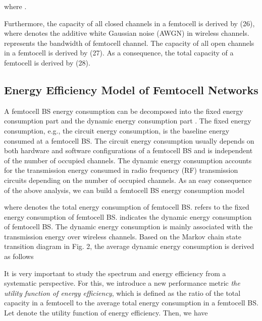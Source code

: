 \documentclass[10pt,final,journal,letterpaper,twoside,twocolumn]{IEEEtran}
\begin{document}
where .

Furthermore, the capacity of all closed channels in a femtocell is derived by (26),
where  denotes the additive white Gaussian noise (AWGN) in wireless
channels.  represents the bandwidth of femtocell channel. The capacity
of all open channels in a femtocell is derived by (27).
As a consequence, the total capacity of a femtocell is derived by (28).
\begin{figure*}[!t]





\end{figure*}



\subsection{Energy Efficiency Model of Femtocell Networks}

A femtocell BS energy consumption can be decomposed into the fixed energy
consumption part and the dynamic energy consumption part \cite{Humar11}. The fixed
energy consumption, e.g., the circuit energy consumption, is the baseline
energy consumed at a femtocell BS. The circuit energy consumption usually
depends on both hardware and software configurations of a femtocell BS and is
independent of the number of occupied channels. The dynamic energy
consumption accounts for the transmission energy consumed in radio
frequency (RF) transmission circuits depending on the number of occupied
channels. As an easy consequence of the above analysis, we can
build a femtocell BS energy consumption model

where  denotes the total energy consumption of femtocell BS.
 refers to the fixed energy consumption of femtocell BS. 
indicates the dynamic energy consumption of femtocell BS. The dynamic energy
consumption is mainly associated with the transmission energy over wireless
channels. Based on the Markov chain state transition diagram in Fig. 2, the
average dynamic energy consumption is derived as follows


It is very important to study the spectrum and energy efficiency from a systematic
perspective. For this, we introduce a new performance metric \textit{the
utility function of energy efficiency}, which is defined as the ratio of the
total capacity in a femtocell to the average total energy consumption in a
femtocell BS. Let  denote the utility function of energy
efficiency. Then, we have
\end{document}
